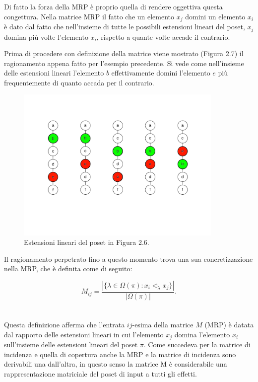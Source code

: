 \documentclass{report}
\begin{document}
Di fatto la forza della MRP è proprio quella di rendere oggettiva questa congettura. Nella matrice MRP il fatto che un elemento $x_j$ domini un elemento $x_i$ è dato dal fatto che nell'insieme di tutte le possibili estensioni lineari del poset, $x_j$ domina più volte l'elemento $x_i$, rispetto a quante volte accade il contrario.


Prima di procedere con definizione della matrice viene mostrato (Figura 2.7) il ragionamento appena fatto per l'esempio precedente. Si vede come nell'insieme delle estensioni lineari l'elemento $b$ effettivamente domini l'elemento $e$ più frequentemente di quanto accada per il contrario.
\begin{figure}[H]
    \centering
    \includegraphics[width=10cm]{IMAGES/poset_10.png}
    \caption{Estensioni lineari del poset in Figura 2.6.}
    \label{fig:roc}
\end{figure}

Il ragionamento perpetrato fino a questo momento trova una sua concretizzazione nella MRP, che è definita come di seguito:

\[M_{ij}=\frac{|\{\lambda \in \Omega(\pi): x_i \lhd_{\lambda} x_j\}|}{|\Omega(\pi)|}.\]
\\~\\
Questa definizione afferma che l'entrata $ij$-esima della matrice $M$ (MRP) è datata dal rapporto delle estensioni lineari in cui l'elemento $x_j$ domina l'elemento $x_i$ sull'insieme delle estensioni lineari del poset $\pi$.
Come succedeva per la matrice di incidenza e quella di copertura anche la MRP e la matrice di incidenza sono derivabili una dall'altra, in questo senso la matrice M è considerabile una rappresentazione matriciale del poset di input a tutti gli effetti.
\end{document}
